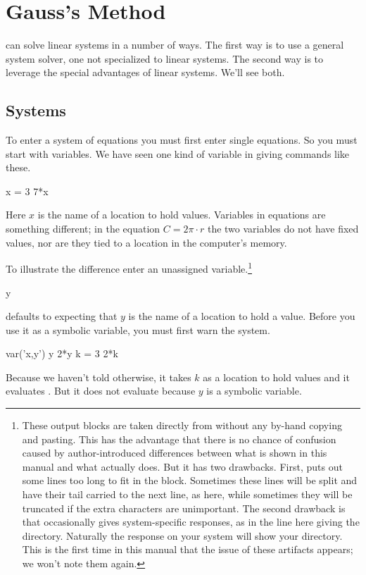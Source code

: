 \chapter{Gauss's Method}

\Sage{} can solve linear systems in a number of ways.
The first way is to use a general system solver, one not specialized to linear
systems.
The second way is to leverage the special advantages of linear systems.
We'll see both. 



\section{Systems}
To enter a system of equations you must first enter single equations.
So you must start with variables.
We have seen one kind of variable in giving commands like these.
\begin{sageoutput}
x = 3
7*x
\end{sageoutput}
Here $x$ is the name of a location to hold values.
Variables in equations are something different; in the equation
$C=2\pi\cdot r$ the two variables do not have fixed values, nor
are they tied to a location in the computer's memory. 

To illustrate the difference enter an unassigned 
variable.\footnote{These output blocks are taken directly from \protect\Sage{}
without any by-hand copying and pasting.
This has the advantage that 
there is no chance of confusion caused by author-introduced differences
between what is shown in this manual and what \protect\Sage{} actually does.
But it has two drawbacks.
First, \protect\Sage{} puts out some lines too long to fit in the block.
Sometimes these lines will be split and have their tail 
carried to the next line, as here, 
while sometimes they will be truncated if the extra characters are unimportant.
The second drawback is that \protect\Sage{} occasionally gives 
system-specific responses, as in the line here giving the directory.
Naturally the response on your system will show your directory.
This is the first time in this manual 
that the issue of these artifacts appears; we won't note them again.}
\begin{sageoutput}[s,1,71,67;s,2,70,66]
y
\end{sageoutput}
\noindent
\Sage{} defaults to expecting that
$y$ is the name of a location to hold a value.
Before you use it as a symbolic variable, you must first
warn the system.
\begin{sageoutput}
var('x,y')
y
2*y
k = 3
2*k
\end{sageoutput}
\noindent
Because we haven't told \Sage{} otherwise, it takes $k$ as a location to hold
values and it evaluates .
But it does not evaluate  because $y$ is a symbolic variable.

